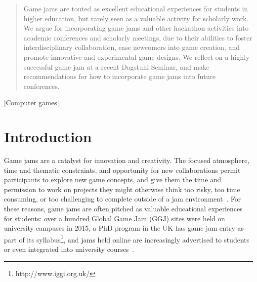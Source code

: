 \documentclass{acm_proc_article-sp}
\newcommand{\mytodo}[1]{\textbf{[[#1]]}}
\begin{document}
\toappear{}
\maketitle
\begin{abstract}
Game jams are touted as excellent educational experiences for students in higher education, but rarely seen as a valuable activity for scholarly work.
We argue for incorporating game jams and other hackathon activities into academic conferences and scholarly meetings, due to their abilities to foster interdisciplinary collaboration, ease newcomers into game creation, and promote innovative and experimental game designs.
We reflect on a highly-successful game jam at a recent Dagstuhl Seminar, and make recommendations for how to incorporate game jams into future conferences.
\end{abstract}


[Computer games]




\section{Introduction}
Game jams are a catalyst for innovation and creativity.
The focused atmosphere, time and thematic constraints, and opportunity for new collaborations permit participants to explore new game concepts, and give them the time and permission to work on projects they might otherwise think too risky, too time consuming, or too challenging to complete outside of a jam environment~\cite{musil2010:jam-software-dev}.
For these reasons, game jams are often pitched as valuable educational experiences for students: over a hundred Global Game Jam (GGJ) sites were held on university campuses in 2015, a PhD program in the UK has game jam entry as part of its syllabus\footnote{http://www.iggi.org.uk/}, and jams held online are increasingly advertised to students or even integrated into university courses~\cite{cook:procjam}.
\end{document}

